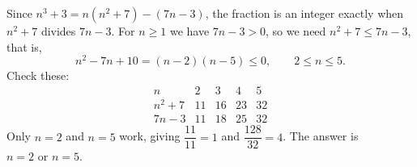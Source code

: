 Since $n^3+3=n(n^2+7)-(7n-3)$, the fraction is an integer exactly when $n^2+7$ divides $7n-3$. For $n\ge1$ we have $7n-3>0$, so we need $n^2+7\le7n-3$, that is,
\[
n^2-7n+10=(n-2)(n-5)\le0,\qquad 2\le n\le5 .
\]
Check these:
\[
\begin{array}{c|cccc}
n & 2 & 3 & 4 & 5\\ \hline
n^2+7 & 11 & 16 & 23 & 32\\
7n-3 & 11 & 18 & 25 & 32
\end{array}
\]
Only $n=2$ and $n=5$ work, giving $\dfrac{11}{11}=1$ and $\dfrac{128}{32}=4$. The answer is $\boxed{n=2\text{ or }n=5}$.
